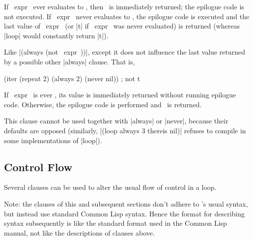 \begin{clauses}

If ~expr~ ever evaluates to
\nil, then \nil\ is immediately returned; the epilogue code is not
executed.  If ~expr~ never evaluates to \nil, the epilogue code
is executed and the last value of ~expr~ (or |t| if ~expr~ was never
evaluated) is returned (whereas |loop| would constantly return |t|).


Like |(always (not ~expr~))|, except it does not influence the last
value returned by a possible other |always| clause. That is,
\begin{program}
(iter (repeat 2)
      (always 2)
      (never nil))  ; not t
\end{program}

If ~expr~ is ever \nonnil,
its value is immediately returned without running epilogue code.
Otherwise, the epilogue code is performed and \nil\ is returned.

This clause cannot be used together with |always| or |never|, because their
defaults are opposed (similarly, |(loop always 3 thereis nil)| refuses to
compile in some implementations of |loop|).

\end{clauses}


\subsection{Control Flow}
\label{control-flow}
Several clauses can be used to alter the usual flow of control in a loop.

Note: the clauses of this and subsequent sections don't adhere to \iter's
usual syntax, but instead use standard Common Lisp syntax.  Hence the
format for describing syntax subsequently is
like the standard format used in the Common Lisp manual, not like the
descriptions of clauses above.

